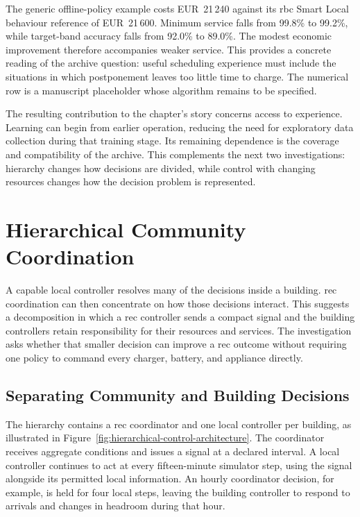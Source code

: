 

\illustrativereading The generic offline-policy example costs EUR~21\,240 against its \gls{rbc} Smart Local behaviour reference of EUR~21\,600. Minimum service falls from 99.8\% to 99.2\%, while target-band accuracy falls from 92.0\% to 89.0\%. The modest economic improvement therefore accompanies weaker service. This provides a concrete reading of the archive question: useful scheduling experience must include the situations in which postponement leaves too little time to charge. The numerical row is a manuscript placeholder whose algorithm remains to be specified.

The resulting contribution to the chapter's story concerns access to experience. Learning can begin from earlier operation, reducing the need for exploratory data collection during that training stage. Its remaining dependence is the coverage and compatibility of the archive. This complements the next two investigations: hierarchy changes how decisions are divided, while control with changing resources changes how the decision problem is represented.


\section{Hierarchical Community Coordination}
\label{sec:hrl}

A capable local controller resolves many of the decisions inside a building. \gls{rec} coordination can then concentrate on how those decisions interact. This suggests a decomposition in which a \gls{rec} controller sends a compact signal and the building controllers retain responsibility for their resources and services. The investigation asks whether that smaller decision can improve a \gls{rec} outcome without requiring one policy to command every charger, battery, and appliance directly.

\subsection{Separating Community and Building Decisions}

The hierarchy contains a \gls{rec} coordinator and one local controller per building, as illustrated in Figure~\ref{fig:hierarchical-control-architecture}. The coordinator receives aggregate conditions and issues a signal at a declared interval. A local controller continues to act at every fifteen-minute simulator step, using the signal alongside its permitted local information. An hourly coordinator decision, for example, is held for four local steps, leaving the building controller to respond to arrivals and changes in headroom during that hour.

